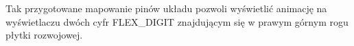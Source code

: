 \documentclass{article}
\begin{document}
        Tak przygotowane mapowanie pinów układu pozwoli wyświetlić animację na wyświetlaczu dwóch cyfr FLEX\_DIGIT znajdującym się w prawym górnym rogu płytki rozwojowej. 

      
      
      
    
    
\end{document}
